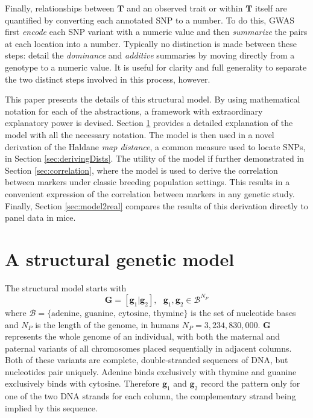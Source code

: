 \documentclass{article}
\newcommand{\ve}[1]{\mathbf{#1}}           %
\newcommand{\m}[1]{\mathbf{#1}}               %
\begin{document}
Finally, relationships between $\m{T}$ and an observed trait or within $\m{T}$ itself are quantified by converting each annotated SNP to a number. To do this, GWAS first \emph{encode} each SNP variant with a numeric value and then \emph{summarize} the pairs at each location into a number. Typically no distinction is made between these steps: \cite{LanderBotstein1989, cheverud2001, siegmundyakir2007} detail the \emph{dominance} and \emph{additive} summaries by moving directly from a genotype to a numeric value. It is useful for clarity and full generality to separate the two distinct steps involved in this process, however.

This paper presents the details of this structural model. By using mathematical notation for each of the abstractions, a framework with extraordinary explanatory power is devised. Section \ref{sec:theModel} provides a detailed explanation of the model with all the necessary notation. The model is then used in a novel derivation of the Haldane \emph{map distance}, a common measure used to locate SNPs, in Section \ref{sec:derivingDists}. The utility of the model if further demonstrated in Section \ref{sec:correlation}, where the model is used to derive the correlation between markers under classic breeding population settings. This results in a convenient expression of the correlation between markers in any genetic study. Finally, Section \ref{sec:model2real} compares the results of this derivation directly to panel data in mice.

\section{A structural genetic model} \label{sec:theModel}

The structural model starts with
$$\m{G} = [\ve{g}_1| \ve{g}_2], \text{ } \ve{g}_1, \ve{g}_2 \in \mathcal{B}^{N_P}$$
where $\mathcal{B} = \{\text{adenine, guanine, cytosine, thymine}\}$ is the set of nucleotide bases and $N_P$ is the length of the genome, in humans $N_P = 3,234,830,000$. $\m{G}$ represents the whole genome of an individual, with both the maternal and paternal variants of all chromosomes placed sequentially in adjacent columns. Both of these variants are complete, double-stranded sequences of DNA, but nucleotides pair uniquely. Adenine binds exclusively with thymine and guanine exclusively binds with cytosine. Therefore $\ve{g}_1$ and $\ve{g}_2$ record the pattern only for one of the two DNA strands for each column, the complementary strand being implied by this sequence.
\end{document}
